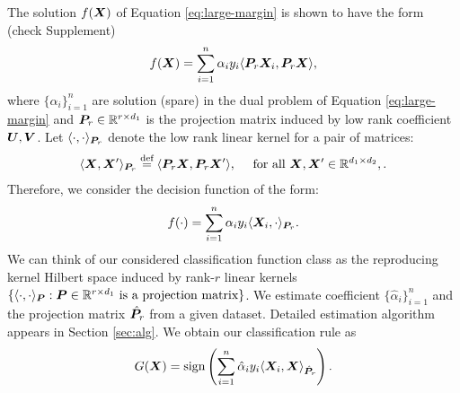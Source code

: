 \documentclass[12pt]{article}
\begin{document}
The solution $f(\bm X)$ of Equation \eqref{eq:large-margin}  is shown to have the form  (check Supplement)
\begin{align}\label{eq:form}
f(\bm X) = \sum_{i=1}^n \alpha_i y_i\langle \bm{P}_r\bm X_i, \bm{P}_r \bm X\rangle,
\end{align}
where $\{\alpha_i\}_{i=1}^n$ are solution  (spare)  in the dual problem of Equation \eqref{eq:large-margin} and $\bm{P}_r\in\mathbb{R}^{r\times d_1}$ is the projection matrix induced by low rank coefficient $\bm{U},\bm{V}$. Let $\langle \cdot,\cdot\rangle_{\bm{P}_r}$ denote the low rank linear kernel for a pair of matrices:
\begin{align}\label{eq:linear kernel}
\langle \bm X,\bm X'\rangle_{\bm{P}_r} \stackrel{\text{def}}{=}\langle \bm{P}_r\bm X,\bm{P}_r\bm X'\rangle, \quad\text{ for all } \bm X,\bm X'\in\mathbb{R}^{d_1\times d_2},.
\end{align}
Therefore, we consider the decision function of the form:
\begin{align}
f(\cdot) = \sum_{i=1}^n \alpha_iy_i\langle\bm X_i,\cdot\rangle_{\bm{P}_r}.
\end{align}
We can think of our considered classification function class as the reproducing kernel Hilbert space induced by rank-$r$ linear kernels $\{\langle \cdot,\cdot\rangle_{\bm{P}}: \bm{P}\in\mathbb{R}^{r\times d_1}\text{ is a projection matrix} \}$.
We estimate coefficient $\{\hat \alpha_i\}_{i=1}^n$ and the projection matrix $\hat {\bm{P}}_r$ from a given dataset. Detailed estimation algorithm appears in Section \ref{sec:alg}. We obtain our classification rule as
\begin{align}
G(\bm X) = \text{sign}\left(\sum_{i=1}^n \hat \alpha_i y_i\langle \bm X_i,\bm X\rangle_{\hat {\bm{P}}_r}\right).
\end{align}
\end{document}

